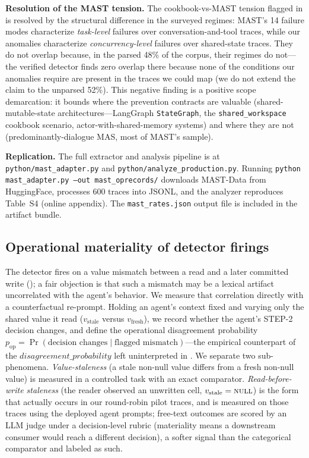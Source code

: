 \documentclass[journal,compsoc,10pt]{IEEEtran}
\theoremstyle{definition}
\theoremstyle{remark}
\newcommand{\fld}[1]{\mathit{#1}}
\begin{document}
\medskip
\noindent\textbf{Resolution of the MAST tension.}
The cookbook-vs-MAST tension flagged in  is resolved by
the structural difference in the surveyed regimes: MAST's 14 failure modes
characterize \emph{task-level} failures over conversation-and-tool traces,
while our anomalies characterize \emph{concurrency-level} failures over
shared-state traces. They do not overlap because, in the parsed 48\% of
the corpus, their regimes do not---the verified detector finds zero
overlap there because none of the conditions our anomalies require are
present in the traces we could map (we do not extend the claim to the
unparsed 52\%). This negative finding is a positive scope demarcation: it
bounds where the prevention contracts are valuable (shared-mutable-state
architectures---LangGraph \texttt{StateGraph}, the \texttt{shared\_workspace}
cookbook scenario, actor-with-shared-memory systems) and where they are
not (predominantly-dialogue MAS, most of MAST's sample).

\medskip
\noindent\textbf{Replication.}
The full extractor and analysis pipeline is at
\texttt{python/mast\_adapter.py} and
\texttt{python/analyze\_production.py}. Running
\texttt{python mast\_adapter.py --out mast\_oprecords/}
downloads MAST-Data from HuggingFace, processes 600 traces
into JSONL, and the analyzer reproduces
Table~S4 (online appendix). The \texttt{mast\_rates.json} output
file is included in the artifact bundle.

\subsection{Operational materiality of detector firings}
\label{sec:operational-materiality}
The detector fires on a value mismatch between a read and a later
committed write (); a fair objection is that
such a mismatch may be a lexical artifact uncorrelated with the agent's
behavior. We measure that correlation directly with a counterfactual
re-prompt. Holding an agent's context fixed and varying only the shared
value it read ($v_{\text{stale}}$ versus $v_{\text{fresh}}$), we record
whether the agent's STEP-2 decision changes, and define the operational
disagreement probability $p_{\text{op}} = \Pr(\text{decision
changes}\mid\text{flagged mismatch})$---the empirical counterpart of the
$\fld{disagreement\_probability}$ left uninterpreted in
. We separate two sub-phenomena.
\emph{Value-staleness} (a stale non-null value differs from a fresh
non-null value) is measured in a controlled task with an exact
comparator. \emph{Read-before-write staleness} (the reader observed an
unwritten cell, $v_{\text{stale}}=\textsc{null}$) is the form that
actually occurs in our round-robin pilot traces, and is measured on those
traces using the deployed agent prompts; free-text outcomes are scored by
an LLM judge under a decision-level rubric (materiality means a downstream
consumer would reach a different decision), a softer signal than the
categorical comparator and labeled as such.
\end{document}
